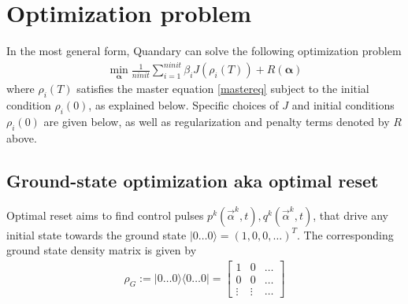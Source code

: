 \documentclass[11pt]{article}
\begin{document}
\section{Optimization problem}
In the most general form, Quandary can solve the following optimization problem
\begin{align}
  \min_{\boldsymbol{\alpha}} \frac{1}{ninit} \sum_{i=1}^{ninit} \beta_i J(\rho_i(T))  + R(\boldsymbol{\alpha})
\end{align}
where $\rho_i(T)$ satisfies the master equation \eqref{mastereq} subject to the initial condition $\rho_i(0)$, as explained below. Specific choices of $J$ and initial conditions $\rho_i(0)$ are given below, as well as regularization and penalty terms denoted by $R$ above. 

\subsection{Ground-state optimization aka optimal
reset}\label{sec:groundstate-obj}
Optimal reset aims to find control pulses $p^k(\vec{\alpha}^k, t), q^k(\vec{\alpha}^k, t)$,
that drive any initial state towards the ground state $|0\dots 0\rangle = (1, 0,
0, \dots )^T$. The corresponding ground state density matrix is given by
\begin{align}
  \rho_{G} := |0\dots 0\rangle \langle 0 \dots 0 | = 
  \begin{bmatrix} 1      & 0      &  \dots   \\ 
                  0      & 0      &  \dots  \\ 
                  \vdots & \vdots &  \dots 
  \end{bmatrix}
\end{align}
\end{document}
